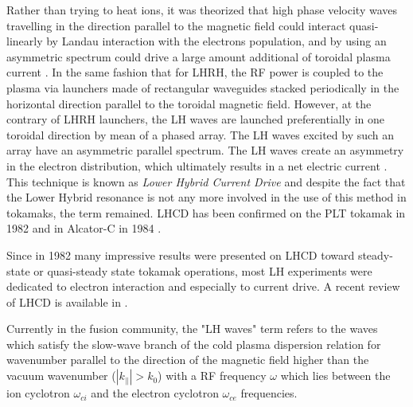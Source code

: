 Rather than trying to heat ions, it was theorized that high phase velocity waves travelling in the direction parallel to the magnetic field could interact quasi-linearly by Landau interaction with the electrons population, and by using an asymmetric spectrum could drive a large amount additional of toroidal plasma current . In the same fashion that for LHRH, the RF power is coupled to the plasma via launchers made of rectangular waveguides stacked periodically in the horizontal direction parallel to the toroidal magnetic field. However, at the contrary of LHRH launchers, the LH waves are launched preferentially in one toroidal direction by mean of a phased array. The LH waves excited by such an array have an asymmetric parallel spectrum. The LH waves create an asymmetry in the electron distribution, which ultimately results in a net electric current . This technique is known as \emph{Lower Hybrid Current Drive} and despite the fact that the Lower Hybrid resonance is not any more involved in the use of this method in tokamaks, the term remained. LHCD has been confirmed on the PLT tokamak in 1982  and in Alcator-C in 1984 . 

Since in 1982 many impressive results were presented on LHCD toward steady-state or quasi-steady state tokamak operations, most LH experiments were dedicated to electron interaction and especially to current drive. A recent review of LHCD is available in .

Currently in the fusion community, the "LH waves" term refers to the waves which satisfy the slow-wave branch of the cold plasma dispersion relation for wavenumber parallel to the direction of the magnetic field higher than the vacuum wavenumber ($|k_{\parallel}|>k_0$) with a RF frequency $\omega$ which lies between the ion cyclotron $\omega_{ci}$ and the electron cyclotron $\omega_{ce}$ frequencies. 



